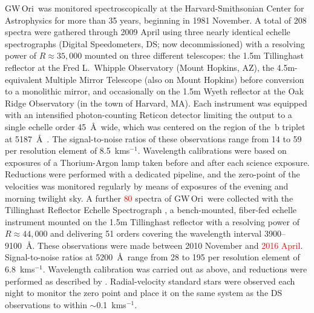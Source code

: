 \documentclass[twocolumn]{aastex61}
\newcommand\kms{\ifmmode{\rm km\thinspace s^{-1}}\else km\thinspace s$^{-1}$\fi}
\newcommand{\todo}[1]{ \textcolor{red}{#1}}
\newcommand{\gw}{GW\,Ori}
\begin{document}
\gw\ was monitored spectroscopically at the Harvard-Smithsonian Center for Astrophysics for more than 35 years, beginning in 1981 November. A total of 208 spectra were gathered through 2009 April using three nearly identical echelle spectrographs (Digital Speedometers, DS; now decommissioned) with a resolving power of $R \approx 35,000$ mounted on three different telescopes: the 1.5m Tillinghast reflector at the Fred L.\ Whipple Observatory (Mount Hopkins, AZ), the 4.5m-equivalent Multiple Mirror Telescope (also on Mount Hopkins) before conversion to a monolithic mirror, and occasionally on the 1.5m Wyeth reflector at the Oak Ridge Observatory (in the town of Harvard, MA).  Each instrument was equipped with an intensified photon-counting Reticon detector limiting the output to a single echelle order 45~\AA\ wide, which was centered on the region of the \,b triplet at 5187~\AA\ \citep[see][]{latham92}. The signal-to-noise ratios of these observations range from 14 to 59 per resolution element of 8.5~\kms. Wavelength calibrations were based on exposures of a Thorium-Argon lamp taken before and after each science exposure. Reductions were performed with a dedicated pipeline, and the zero-point of the velocities was monitored regularly by means of exposures of the evening and morning twilight sky. A further \todo{80} spectra of \gw\ were collected with the Tillinghast Reflector Echelle Spectrograph \citep[TRES;][]{furesz08}, a bench-mounted, fiber-fed echelle instrument mounted on the 1.5m Tillinghast reflector with a resolving power of $R \approx 44,000$ and delivering 51 orders covering the wavelength interval 3900--9100~\AA. These observations were made between 2010 November and \todo{2016 April}.  Signal-to-noise ratios at 5200~\AA\ range from 28 to 195 per resolution element of 6.8~\kms. Wavelength calibration was carried out as above, and reductions were performed as described by \cite{buchhave10}. Radial-velocity standard stars were observed each night to monitor the zero point and place it on the same system as the DS observations to within $\sim$0.1~\kms.
\end{document}
